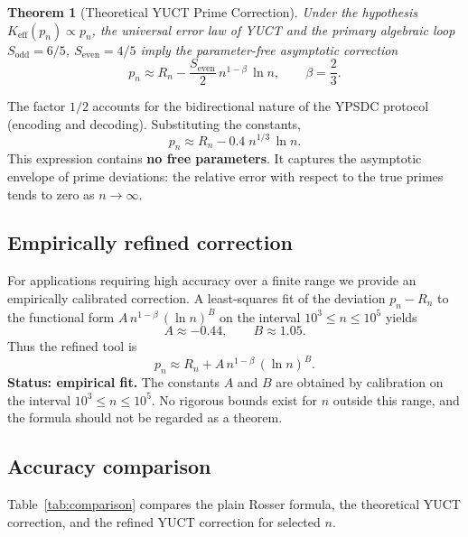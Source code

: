 \documentclass[12pt,a4paper]{article}
\newtheorem{theorem}{Theorem}[section]
\newcommand{\Sodd}{S_{\mathrm{odd}}}
\newcommand{\Seven}{S_{\mathrm{even}}}
\begin{document}
	\begin{theorem}[Theoretical YUCT Prime Correction]\label{thm:yuct-prime-theory}
		Under the hypothesis \(K_{\mathrm{eff}}(p_n) \propto p_n\), the universal error law of YUCT and the primary algebraic loop \(\Sodd=6/5\), \(\Seven=4/5\) imply the parameter-free asymptotic correction
		\begin{equation}\label{eq:yuct-prime-theory}
			\boxed{ p_n \approx R_n - \frac{\Seven}{2}\, n^{1-\beta}\,\ln n },
			\qquad \beta = \frac{2}{3}.
		\end{equation}
	\end{theorem}
	
	The factor \(1/2\) accounts for the bidirectional nature of the YPSDC protocol (encoding and decoding). Substituting the constants,
	\[
	p_n \approx R_n - 0.4\; n^{1/3}\,\ln n .
	\]
	This expression contains \textbf{no free parameters}. It captures the asymptotic envelope of prime deviations: the relative error with respect to the true primes tends to zero as \(n\to\infty\).
	
	\subsection{Empirically refined correction}
	For applications requiring high accuracy over a finite range we provide an empirically calibrated correction. A least-squares fit of the deviation \(p_n - R_n\) to the functional form \(A\,n^{1-\beta}\,(\ln n)^B\) on the interval \(10^3 \le n \le 10^5\) yields
	\[
	A \approx -0.44, \qquad B \approx 1.05.
	\]
	Thus the refined tool is
	\begin{equation}\label{eq:yuct-prime-empirical}
		\boxed{ p_n \approx R_n + A\,n^{1-\beta}\,(\ln n)^B }.
	\end{equation}
	\textbf{Status: empirical fit.} The constants \(A\) and \(B\) are obtained by calibration on the interval \(10^3 \le n \le 10^5\). No rigorous bounds exist for \(n\) outside this range, and the formula should not be regarded as a theorem.
	
	\subsection{Accuracy comparison}
	Table~\ref{tab:comparison} compares the plain Rosser formula, the theoretical YUCT correction, and the refined YUCT correction for selected \(n\).
	
\end{document}

